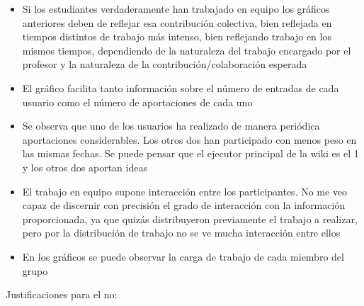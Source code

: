 \begin{itemize}
\item Si los estudiantes verdaderamente han trabajado en equipo los gráficos anteriores deben de reflejar esa contribución colectiva, bien reflejada en tiempos distintos de trabajo más intenso, bien reflejando trabajo en los mismos tiempos, dependiendo de la naturaleza del trabajo encargado por el profesor y la naturaleza de la contribución/colaboración esperada
\item El gráfico facilita tanto información sobre el número de entradas de cada usuario como el número de aportaciones de cada uno
\item Se observa que uno de los usuarios ha realizado de manera periódica aportaciones considerables. Los otros dos han participado con menos peso  en las mismas fechas. Se puede pensar que el ejecutor principal de la wiki es el 1 y los otros dos aportan ideas 
\item El trabajo en equipo supone interacción entre los participantes. No me veo capaz de discernir con precisión el grado de interacción con la información proporcionada, ya que quizás distribuyeron previamente el trabajo a realizar, pero por la distribución de trabajo no se ve mucha interacción entre ellos
\item En los gráficos se puede observar la carga de trabajo de cada miembro del grupo
\end{itemize}

Justificaciones para el no:

